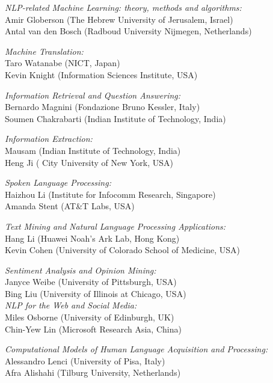 \smallskip
\noindent
\textit{NLP-related Machine Learning: theory, methods and algorithms:}\\
  Amir Globerson (The Hebrew University of Jerusalem, Israel)\\
  Antal van den Bosch (Radboud University Nijmegen, Netherlands)

\smallskip
\noindent
\textit{Machine Translation:}\\
  Taro Watanabe (NICT, Japan)\\
  Kevin Knight (Information Sciences Institute, USA)

\smallskip
\noindent
\textit{Information Retrieval and Question Answering:}\\
  Bernardo Magnini (Fondazione Bruno Kessler, Italy)\\
  Soumen Chakrabarti (Indian Institute of Technology, India)

\smallskip
\noindent
\textit{Information Extraction:}\\
  Mausam (Indian Institute of Technology, India)\\
  Heng Ji ( City University of New York, USA)

\smallskip
\noindent
\textit{Spoken Language Processing:}\\
  Haizhou Li (Institute for Infocomm Research, Singapore)\\
  Amanda Stent (AT\&T Labs, USA)

\smallskip
\noindent
\textit{Text Mining and Natural Language Processing Applications:}\\
  Hang Li (Huawei Noah's Ark Lab, Hong Kong)\\
  Kevin Cohen (University of Colorado School of Medicine, USA)

\smallskip
\noindent
\textit{Sentiment Analysis and Opinion Mining:}\\
  Janyce Weibe (University of Pittsburgh, USA)\\
  Bing Liu (University of Illinois at Chicago, USA)\\

\noindent
\textit{NLP for the Web and Social Media:}\\
  Miles Osborne (University of Edinburgh, UK)\\
  Chin-Yew Lin (Microsoft Research Asia, China)

\smallskip
\noindent
\textit{Computational Models of Human Language Acquisition and Processing:}\\
  Alessandro Lenci (University of Pisa, Italy)\\
  Afra Alishahi (Tilburg University, Netherlands)


